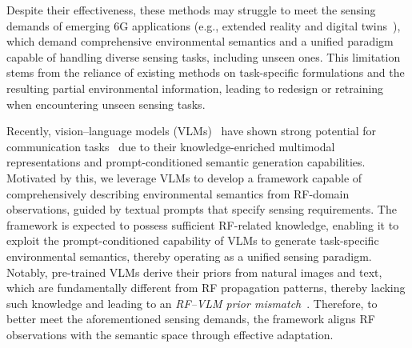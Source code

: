\documentclass[journal,10pt,twocolumn]{IEEEtran}
\begin{document}

Despite their effectiveness, these methods may struggle to meet the sensing demands of emerging 6G applications (e.g., extended reality and digital twins~\cite{10494372}), which demand comprehensive environmental semantics and a unified paradigm capable of handling diverse sensing tasks, including unseen ones. This limitation stems from the reliance of existing methods on task-specific formulations and the resulting partial environmental information, leading to redesign or retraining when encountering unseen sensing tasks.


Recently, vision–language models (VLMs)~\cite{bai2025qwen2} have shown strong potential for communication tasks~\cite{11434852,11432820} due to their knowledge-enriched multimodal representations and prompt-conditioned semantic generation capabilities. Motivated by this, we leverage VLMs to develop a framework capable of comprehensively describing environmental semantics from RF-domain observations, guided by textual prompts that specify sensing requirements. The framework is expected to possess sufficient RF-related knowledge, enabling it to exploit the prompt-conditioned capability of VLMs to generate task-specific environmental semantics, thereby operating as a unified sensing paradigm. Notably, pre-trained VLMs derive their priors from natural images and text, which are fundamentally different from RF propagation patterns, thereby lacking such knowledge and leading to an \emph{RF--VLM prior mismatch}~\cite{10892257}. Therefore, to better meet the aforementioned sensing demands, the framework aligns RF observations with the semantic space through effective adaptation.


\end{document}
